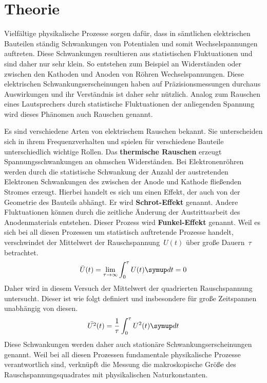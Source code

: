 \section{Theorie}
\label{sec:theorie}

Vielfältige physikalische Prozesse sorgen dafür, dass in sämtlichen elektrischen
Bauteilen ständig Schwankungen von Potentialen und somit Wechselspannungen
auftreten. Diese Schwankungen resultieren aus statistischen Fluktuationen und
sind daher nur sehr klein. So entstehen zum Beispiel an Widerständen oder
zwischen den Kathoden und Anoden von Röhren Wechselspannungen. Diese
elektrischen Schwankungserscheinungen haben auf Präzisionsmessungen durchaus
Auswirkungen und ihr Verständnis ist daher sehr nützlich. Analog zum Rauschen
eines Lautsprechers durch statistische Fluktuationen der anliegenden Spannung
wird dieses Phänomen auch Rauschen genannt.

Es sind verschiedene Arten von elektrischem Rauschen bekannt. Sie unterscheiden
sich in ihrem Frequenzverhalten und spielen für verschiedene Bauteile
unterschiedlich wichtige Rollen. Das \textbf{thermische Rauschen} erzeugt
Spannungsschwankungen an ohmschen Widerständen. Bei Elektronenröhren werden
durch die statistische Schwankung der Anzahl der austretenden Elektronen
Schwankungen des zwischen der Anode und Kathode fließenden Stromes erzeugt.
Hierbei handelt es sich um einen Effekt, der auch von der Geometrie des Bauteils
abhängt. Er wird \textbf{Schrot-Effekt} genannt. Andere Fluktuationen können
durch die zeitliche Änderung der Austrittsarbeit des Anodenmaterials entstehen.
Dieser Prozess wird \textbf{Funkel-Effekt} genannt. Weil es sich bei all diesen
Prozessen um statistisch auftretende Prozesse handelt, verschwindet der
Mittelwert der Rauschspannung~$U(t)$ über große Dauern~$\tau$ betrachtet.
%
\begin{equation}
  \bar{U}(t)=\lim_{\tau\rightarrow\infty}\int_0^\tau U(t)\upd t=0
\end{equation}
%
Daher wird in diesem Versuch der Mittelwert der quadrierten Rauschspannung
untersucht. Dieser ist wie folgt definiert und insbesondere für große
Zeitspannen unabhängig von diesen.
%
\begin{equation}
  \bar{U^2}(t) =\frac{1}{\tau}\int_0^\tau U^2(t) \upd t
\end{equation}
%
Diese Schwankungen werden daher auch stationäre Schwankungserscheinungen
genannt. Weil bei all diesen Prozessen fundamentale physikalische Prozesse
verantwortlich sind, verknüpft die Messung die makroskopische Größe des
Rauschspannungsquadrates mit physikalischen Naturkonstanten.
%
